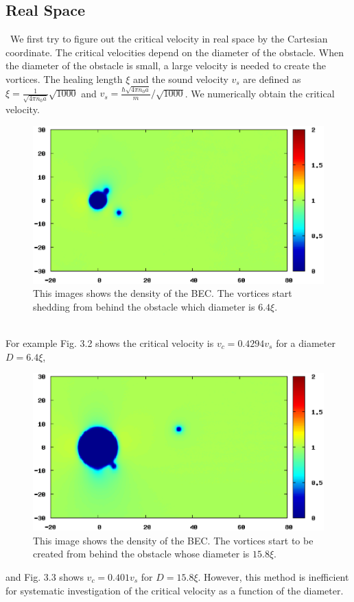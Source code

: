 \documentclass[12pt,a4paper]{report}
\begin{document}
\subsection{Real Space}
\ We first try to figure out the critical velocity in real space by the Cartesian coordinate.
The critical velocities depend on the diameter of the obstacle.
When the diameter of the obstacle is small, a large velocity is needed to create the vortices.
The healing length $\xi$ and the sound velocity $v_s$ are defined as
$\xi = \frac{1}{\sqrt{4 \pi n_0 a}}\sqrt{1000}$ and $v_s = \frac{\hbar \sqrt{4 \pi n_0 a}}{m}/\sqrt{1000}$.
We numerically obtain the critical velocity.
\begin{figure}[htbp]\begin{center}
\includegraphics[scale=0.4,keepaspectratio]{3-2.eps}
\caption{
This images shows the density of the BEC.
The vortices start shedding from behind the obstacle which diameter is $6.4\xi$.
}
\label{FIG:3-2}
\end{center}\end{figure}
\\ For example Fig. 3.2 shows the critical velocity is $v_c = 0.4294v_s$ for a diameter $D = 6.4\xi$,
\begin{figure}[htbp]\begin{center}
\includegraphics[scale=0.4,keepaspectratio]{3-3.eps}
\caption{
This image shows the density of the BEC.
The vortices start to be created from behind the obstacle whose diameter is $15.8 \xi$.
}
\label{FIG:3-3}
\end{center}\end{figure}
and Fig. 3.3 shows $v_c = 0.401v_s$ for $D = 15.8\xi$.
However, this method is inefficient for systematic investigation of the critical velocity
as a function of the diameter.
\end{document}
